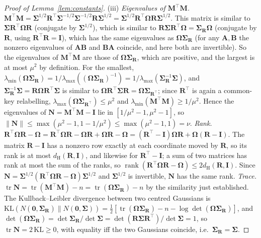 \documentclass[11pt]{article}
\theoremstyle{definition}
\newcommand{\bI}{\mathbf{I}}
\newcommand{\bR}{\mathbf{R}}
\newcommand{\bM}{\mathbf{M}}
\newcommand{\bN}{\mathbf{N}}
\newcommand{\bzero}{\mathbf{0}}
\newcommand{\bSig}{\boldsymbol{\Sigma}}
\newcommand{\bOm}{\boldsymbol{\Omega}}
\newcommand{\tr}{\operatorname{tr}}
\newcommand{\dH}{d_{\mathrm{H}}}
\begin{document}
\begin{proof}[Proof of Lemma~\ref{lem:constants}]
(iii) \emph{Eigenvalues of $\bM^\top\bM$.} $\bM^\top\bM=\bSig^{1/2}\bR^\top\bSig^{-1/2}\bSig^{-1/2}\bR\bSig^{1/2}=\bSig^{1/2}\bR^\top\bOm\bR\bSig^{1/2}$. This matrix is similar to $\bSig\bR^\top\bOm\bR$ (conjugate by $\bSig^{1/2}$), which is similar to $\bR\bSig\bR^\top\bOm=\bSig_{\bR}\bOm$ (conjugate by $\bR$, using $\bR^\top\bR=\bI$), which has the same eigenvalues as $\bOm\bSig_{\bR}$ (for any $\mathbf A,\mathbf B$ the nonzero eigenvalues of $\mathbf{AB}$ and $\mathbf{BA}$ coincide, and here both are invertible). So the eigenvalues of $\bM^\top\bM$ are those of $\bOm\bSig_{\bR}$, which are positive, and the largest is at most $\mu^2$ by definition. For the smallest, $\lambda_{\min}(\bOm\bSig_{\bR})=1/\lambda_{\max}((\bOm\bSig_{\bR})^{-1})=1/\lambda_{\max}(\bSig_{\bR}^{-1}\bSig)$, and $\bSig_{\bR}^{-1}\bSig=\bR\bOm\bR^\top\bSig$ is similar to $\bOm\bR^\top\bSig\bR=\bOm\bSig_{\bR^\top}$; since $\bR^\top$ is again a common-key relabelling, $\lambda_{\max}(\bOm\bSig_{\bR^\top})\le\mu^2$ and $\lambda_{\min}(\bM^\top\bM)\ge1/\mu^2$. Hence the eigenvalues of $\bN=\bM^\top\bM-\bI$ lie in $[1/\mu^2-1,\mu^2-1]$, so $\|\bN\|\le\max(\mu^2-1,1-1/\mu^2)\le\max(\mu^2-1,1)=\nu$.
\emph{Rank.} $\bR^\top\bOm\bR-\bOm=\bR^\top\bOm\bR-\bOm\bR+\bOm\bR-\bOm=(\bR^\top-\bI)\bOm\bR+\bOm(\bR-\bI)$. The matrix $\bR-\bI$ has a nonzero row exactly at each coordinate moved by $\bR$, so its rank is at most $\dH(\bR,\bI)$, and likewise for $\bR^\top-\bI$; a sum of two matrices has rank at most the sum of the ranks, so $\operatorname{rank}(\bR^\top\bOm\bR-\bOm)\le2\dH(\bR,\bI)$. Since $\bN=\bSig^{1/2}(\bR^\top\bOm\bR-\bOm)\bSig^{1/2}$ and $\bSig^{1/2}$ is invertible, $\bN$ has the same rank.
\emph{Trace.} $\tr\bN=\tr(\bM^\top\bM)-n=\tr(\bOm\bSig_{\bR})-n$ by the similarity just established. The Kullback--Leibler divergence between two centred Gaussians is $\mathrm{KL}(N(\bzero,\bSig_{\bR})\|N(\bzero,\bSig))=\tfrac12[\tr(\bOm\bSig_{\bR})-n-\log\det(\bOm\bSig_{\bR})]$, and $\det(\bOm\bSig_{\bR})=\det\bSig_{\bR}/\det\bSig=\det(\bR\bSig\bR^\top)/\det\bSig=1$, so $\tr\bN=2\,\mathrm{KL}\ge0$, with equality iff the two Gaussians coincide, i.e.\ $\bSig_{\bR}=\bSig$.


\end{proof}
\end{document}
